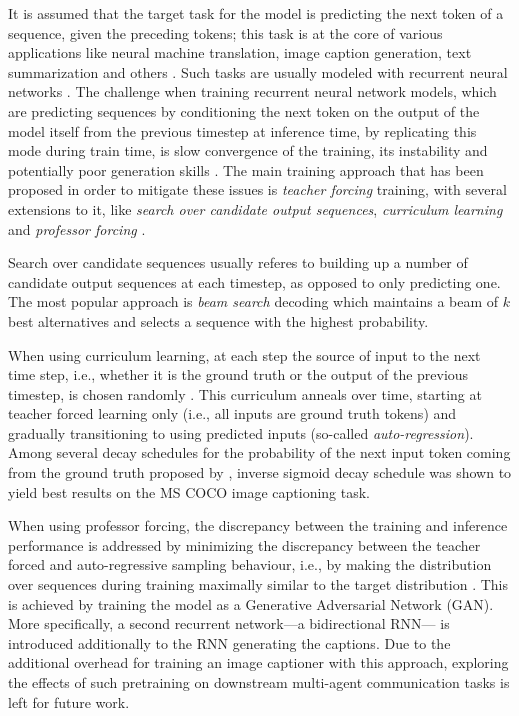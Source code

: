 It is assumed that the target task for the model is predicting the next token of a sequence, given the preceding tokens; this task is at the core of various applications like neural machine translation, image caption generation, text summarization and others \parencite[e.g.,][]{cho2014learning, sutskever2014sequence}. Such tasks are usually modeled with recurrent neural networks \parencite{rumelhart1986learning}. The challenge when training recurrent neural network models, which are predicting sequences by conditioning the next token on the output of the model itself from the previous timestep
at inference time, by replicating this mode during train time, is slow convergence of the training, its instability and potentially poor generation skills \parencite{lamb2016professor}. The main training approach that has been proposed in order to mitigate these issues is \textit{teacher forcing} training, with several extensions to it, like \textit{search over candidate output sequences}, \textit{curriculum learning} and \textit{professor forcing} \parencite{goodfellow2016deep, williams1989algorithm}.

Search over candidate sequences usually referes to building up a number of candidate output sequences at each timestep, as opposed to only predicting one. The most popular approach is \textit{beam search} decoding which maintains a beam of $k$ best alternatives and selects a sequence with the highest probability.

When using curriculum learning, at each step the source of input to the next time step, i.e., whether it is the ground truth or the output of the previous timestep, is chosen randomly \parencite{bengio2015scheduled}. This curriculum anneals over time, starting at teacher forced learning only (i.e., all inputs are ground truth tokens) and gradually transitioning to using predicted inputs (so-called \textit{auto-regression}). Among several decay schedules for the probability of the next input token coming from the ground truth proposed by \cite{bengio2015scheduled}, inverse sigmoid decay schedule  was shown to yield best results on the MS COCO image captioning task.

When using professor forcing, the discrepancy between the training and inference performance is addressed by minimizing the discrepancy between the teacher forced and auto-regressive sampling behaviour, i.e., by making the distribution over sequences during training maximally similar to the target distribution \parencite{lamb2016professor}. This is achieved by training the model as a Generative Adversarial Network (GAN). More specifically, a second recurrent network---a bidirectional RNN---  is introduced additionally to the RNN generating the captions. Due to the additional overhead for training an image captioner with this approach, exploring the effects of such pretraining on downstream multi-agent communication tasks is left for future work.

